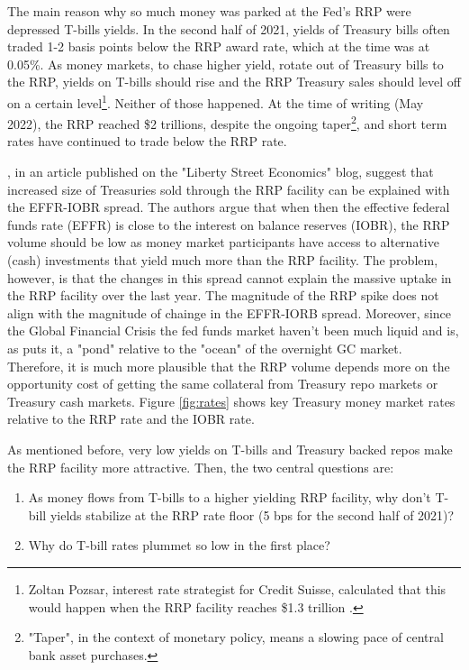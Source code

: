 \documentclass[11pt,a4paper,english,oneside]{article}
\begin{document}
The main reason why so much money was parked at the Fed's RRP were depressed T-bills yields. In the second half of 2021, yields of Treasury bills often traded 1-2 basis points below the RRP award rate, which at the time was at 0.05\%. As money markets, to chase higher yield, rotate out of Treasury bills to the RRP, yields on T-bills should rise and the RRP Treasury sales should level off on a certain level\footnote{Zoltan Pozsar, interest rate strategist for Credit Suisse, calculated that this would happen when the RRP facility reaches \$1.3 trillion \citep{gmd070721}.}. Neither of those happened. At the time of writing (May 2022), the RRP reached \$2 trillions, despite the ongoing taper\footnote{"Taper", in the context of monetary policy, means a slowing pace of central bank asset purchases.}, and short term rates have continued to trade below the RRP rate.

\citet{alfonso2022}, in an article published on the "Liberty Street Economics" blog, suggest that increased size of Treasuries sold through the RRP facility can be explained with the EFFR-IOBR spread. The authors argue that when then the effective federal funds rate (EFFR) is close to the interest on balance reserves (IOBR), the RRP volume should be low as money market participants have access to alternative (cash) investments that yield much more than the RRP facility. The problem, however, is that the changes in this spread cannot explain the massive uptake in the RRP facility over the last year. The magnitude of the RRP spike does not align with the magnitude of chainge in the EFFR-IORB spread. Moreover, since the Global Financial Crisis the fed funds market haven't been much liquid and is, as \citet{gmn22} puts it, a "pond" relative to the "ocean" of the overnight GC market. Therefore, it is much more plausible that the RRP volume depends more on the opportunity cost of getting the same collateral from Treasury repo markets or Treasury cash markets. Figure \ref{fig:rates} shows key Treasury money market rates relative to the RRP rate and the IOBR rate.

As mentioned before, very low yields on T-bills and Treasury backed repos make the RRP facility more attractive. Then, the two central questions are:
\begin{enumerate}
  \item As money flows from T-bills to a higher yielding RRP facility, why don't T-bill yields stabilize at the RRP rate floor (5 bps for the second half of 2021)?
  \item Why do T-bill rates plummet so low in the first place?
\end{enumerate}
\end{document}
